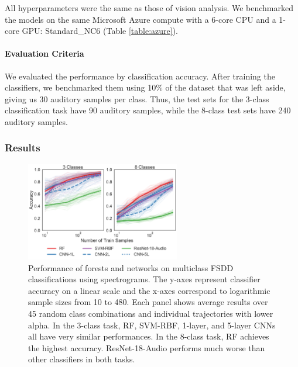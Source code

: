 All hyperparameters were the same as those of vision analysis. We benchmarked the models on the same Microsoft Azure compute with a 6-core CPU and a 1-core GPU: Standard\_NC6 (Table \ref{table:azure}).

\paragraph{Evaluation Criteria}
We evaluated the performance by classification accuracy. After training the classifiers, we benchmarked them using 10\% of the dataset that was left aside, giving us 30 auditory samples per class.
Thus, the test sets for the 3-class classification task have 90 auditory samples, while the 8-class test sets have 240 auditory samples.

\subsubsection{Results}

\begin{figure}[htb]
\centering
\includegraphics[width=0.6\textwidth]{figures/spoken}
  \caption{Performance of forests and networks on multiclass FSDD classifications using spectrograms. 
  The y-axes represent classifier accuracy on a linear scale and the x-axes correspond to logarithmic sample sizes from 10 to 480. Each panel shows average results over 45 random class combinations and individual trajectories with lower alpha.
  In the 3-class task, RF, SVM-RBF, 1-layer, and 5-layer CNNs all have very similar performances. In the 8-class task, RF achieves the highest accuracy. ResNet-18-Audio performs much worse than other classifiers in both tasks.
  }
\label{fig:spoken_digit}
\end{figure}

